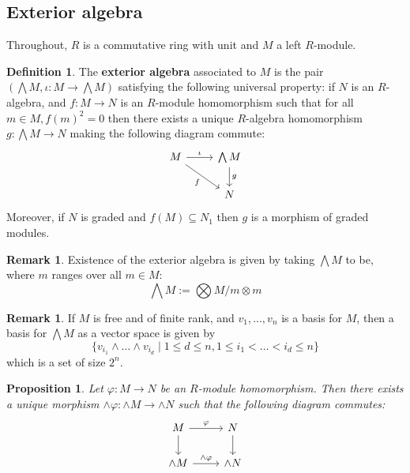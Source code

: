 \documentclass[12pt]{article}
\theoremstyle{plain}
\newtheorem{proposition}[thm]{Proposition}
\theoremstyle{definition}
\newtheorem{defn}[thm]{Definition} %
\newtheorem{remark}[thm]{Remark}
\newcommand{\lto}{\longrightarrow}
\begin{document}
\subsection{Exterior algebra}
Throughout, $R$ is a commutative ring with unit and $M$ a left $R$-module.
\begin{defn}
The \textbf{exterior algebra} associated to $M$ is the pair $(\bigwedge M, \iota: M \lto \bigwedge M)$ satisfying the following universal property: if $N$ is an $R$-algebra, and $f: M \lto N$ is an $R$-module homomorphism such that for all $m \in M, f(m)^2 = 0$ then there exists a unique $R$-algebra homomorphism $g: \bigwedge M \lto N$ making the following diagram commute:
\begin{equation}
\begin{tikzcd}
M\arrow[r,"{\iota}"]\arrow[dr,swap,"{f}"] & \bigwedge M\arrow[d,"g"]\\
& N
\end{tikzcd}
\end{equation}
Moreover, if $N$ is graded and $f(M) \subseteq N_1$ then $g$ is a morphism of graded modules.
\end{defn}
\begin{remark}\label{rmk:existence_wedge}
Existence of the exterior algebra is given by taking $\bigwedge M$ to be, where $m$ ranges over all $m \in M$:
\begin{equation}
\bigwedge M := \bigotimes M/m \otimes m
\end{equation}
\end{remark}
\begin{remark}
If $M$ is free and of finite rank, and $v_1,...,v_n$ is a basis for $M$, then a basis for $\bigwedge M$ as a vector space is given by
\begin{equation}
\lbrace v_{i_1} \wedge \hdots \wedge v_{i_d} \mid 1 \leq d \leq n, 1 \leq i_1 < \hdots < i_d \leq n\rbrace
\end{equation}
which is a set of size $2^n$.
\end{remark}
\begin{proposition}\label{prop:wedge_morphism}
Let $\varphi: M \lto N$ be an $R$-module homomorphism. Then there exists a unique morphism $\wedge \varphi: \wedge M \lto \wedge N$ such that the following diagram commutes:
\begin{equation}
\begin{tikzcd}
M\arrow[r,"{\varphi}"]\arrow[d] & N\arrow[d]\\
\wedge M\arrow[r,"{\wedge \varphi}"] & \wedge N
\end{tikzcd}
\end{equation}
\end{proposition}
\end{document}
